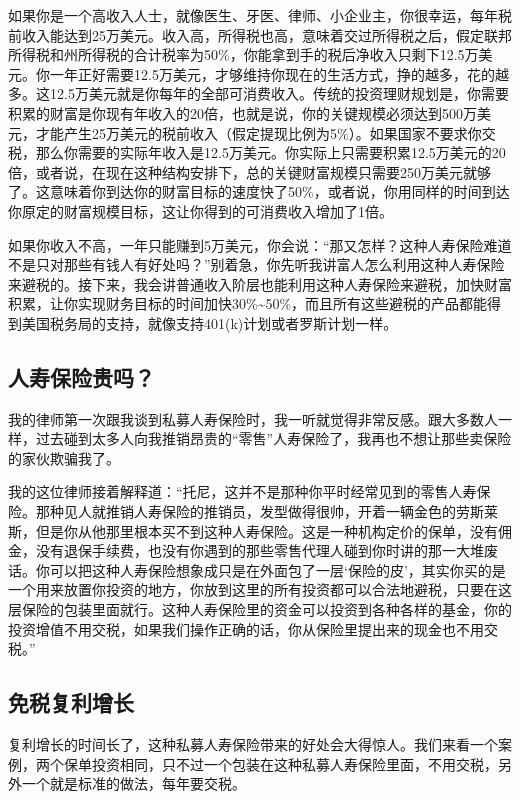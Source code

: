 如果你是一个高收入人士，就像医生、牙医、律师、小企业主，你很幸运，每年税前收入能达到25万美元。收入高，所得税也高，意味着交过所得税之后，假定联邦所得税和州所得税的合计税率为50\%，你能拿到手的税后净收入只剩下12.5万美元。你一年正好需要12.5万美元，才够维持你现在的生活方式，挣的越多，花的越多。这12.5万美元就是你每年的全部可消费收入。传统的投资理财规划是，你需要积累的财富是你现有年收入的20倍，也就是说，你的关键规模必须达到500万美元，才能产生25万美元的税前收入（假定提现比例为5\%）。如果国家不要求你交税，那么你需要的实际年收入是12.5万美元。你实际上只需要积累12.5万美元的20倍，或者说，在现在这种结构安排下，总的关键财富规模只需要250万美元就够了。这意味着你到达你的财富目标的速度快了50\%，或者说，你用同样的时间到达你原定的财富规模目标，这让你得到的可消费收入增加了1倍。

如果你收入不高，一年只能赚到5万美元，你会说：“那又怎样？这种人寿保险难道不是只对那些有钱人有好处吗？”别着急，你先听我讲富人怎么利用这种人寿保险来避税的。接下来，我会讲普通收入阶层也能利用这种人寿保险来避税，加快财富积累，让你实现财务目标的时间加快30\%\textasciitilde{}50\%，而且所有这些避税的产品都能得到美国税务局的支持，就像支持401(k)计划或者罗斯计划一样。

\subsection{人寿保险贵吗？}

我的律师第一次跟我谈到私募人寿保险时，我一听就觉得非常反感。跟大多数人一样，过去碰到太多人向我推销昂贵的“零售”人寿保险了，我再也不想让那些卖保险的家伙欺骗我了。

我的这位律师接着解释道：“托尼，这并不是那种你平时经常见到的零售人寿保险。那种见人就推销人寿保险的推销员，发型做得很帅，开着一辆金色的劳斯莱斯，但是你从他那里根本买不到这种人寿保险。这是一种机构定价的保单，没有佣金，没有退保手续费，也没有你遇到的那些零售代理人碰到你时讲的那一大堆废话。你可以把这种人寿保险想象成只是在外面包了一层‘保险的皮’，其实你买的是一个用来放置你投资的地方，你放到这里的所有投资都可以合法地避税，只要在这层保险的包装里面就行。这种人寿保险里的资金可以投资到各种各样的基金，你的投资增值不用交税，如果我们操作正确的话，你从保险里提出来的现金也不用交税。”

\subsection{免税复利增长}

复利增长的时间长了，这种私募人寿保险带来的好处会大得惊人。我们来看一个案例，两个保单投资相同，只不过一个包装在这种私募人寿保险里面，不用交税，另外一个就是标准的做法，每年要交税。

